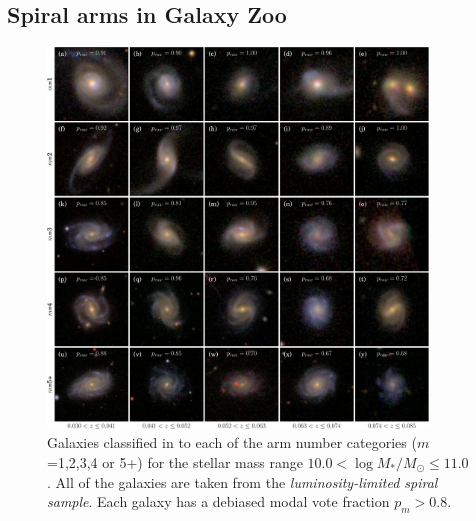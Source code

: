 \documentclass[useAMS,usenatbib]{mn2e}
\begin{document}
\subsection{Spiral arms in Galaxy Zoo}
\label{sec:defining_the_sample}

\begin{figure}
		\centering

        \includegraphics[width=0.9\textwidth]{Images/Results/image_page_p0810_m106110.pdf}

        \caption{Galaxies classified in to each of the arm number categories ($m$=1,2,3,4 or 5+) for the stellar mass range $10.0 < \log{M_*/M_{\odot}} \leq 11.0$. All of the galaxies are taken from the \textit{luminosity-limited spiral sample}. Each galaxy has a debiased modal vote fraction $p_m>0.8$.}

        \label{fig:image_panel_secure}

\end{figure}
\end{document}
